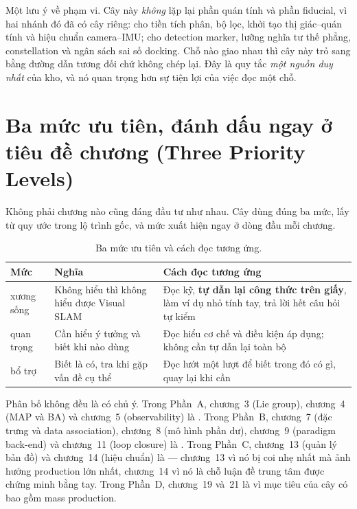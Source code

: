 \documentclass[vslam.tex]{subfiles}
\begin{document}
Một lưu ý về phạm vi. Cây này \emph{không} lặp lại phần quán tính và phần fiducial, vì hai nhánh đó đã có cây riêng:  cho tiền tích phân, bộ lọc, khởi tạo thị giác--quán tính và hiệu chuẩn camera--IMU;  cho detection marker, lưỡng nghĩa tư thế phẳng, constellation và ngân sách sai số docking. Chỗ nào giao nhau thì cây này trỏ sang bằng đường dẫn tương đối chứ không chép lại. Đây là quy tắc \emph{một nguồn duy nhất} của kho, và nó quan trọng hơn sự tiện lợi của việc đọc một chỗ.

\section*{Ba mức ưu tiên, đánh dấu ngay ở tiêu đề chương (Three Priority Levels)}

Không phải chương nào cũng đáng đầu tư như nhau. Cây dùng đúng ba mức, lấy từ quy ước trong lộ trình gốc, và mức xuất hiện ngay ở dòng đầu mỗi chương.

\begin{table}[H]\centering\small
\caption{Ba mức ưu tiên và cách đọc tương ứng.}
\label{tab:ba-muc}
\begin{tabularx}{\linewidth}{@{}L{2.0cm}L{4.3cm}Y@{}}
\toprule
\textbf{Mức} & \textbf{Nghĩa} & \textbf{Cách đọc tương ứng}\\
\midrule
{} xương sống & Không hiểu thì không hiểu được Visual SLAM & Đọc kỹ, \textbf{tự dẫn lại công thức trên giấy}, làm ví dụ nhỏ tính tay, trả lời hết câu hỏi tự kiểm\\
 quan trọng & Cần hiểu ý tưởng và biết khi nào dùng & Đọc hiểu cơ chế và điều kiện áp dụng; không cần tự dẫn lại toàn bộ\\
 bổ trợ & Biết là có, tra khi gặp vấn đề cụ thể & Đọc lướt một lượt để biết trong đó có gì, quay lại khi cần\\
\bottomrule
\end{tabularx}
\end{table}

Phân bố không đều là có chủ ý. Trong Phần~A, chương~3 (Lie group), chương~4 (MAP và BA) và chương~5 (observability) là . Trong Phần~B, chương~7 (đặc trưng và data association), chương~8 (mô hình phần dư), chương~9 (paradigm back-end) và chương~11 (loop closure) là . Trong Phần~C, chương~13 (quản lý bản đồ) và chương~14 (hiệu chuẩn) là  --- chương~13 vì nó bị coi nhẹ nhất mà ảnh hưởng production lớn nhất, chương~14 vì nó là chỗ luận đề trung tâm được chứng minh bằng tay. Trong Phần~D, chương~19 và~21 là  vì mục tiêu của cây có bao gồm mass production.
\end{document}
